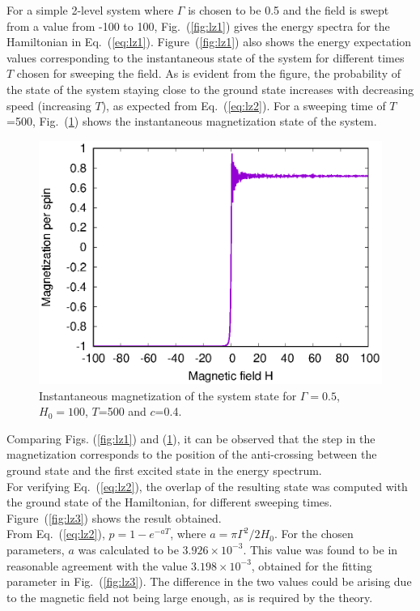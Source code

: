 \documentclass[../main.tex]{subfiles}
\begin{document}
For a simple 2-level system where $\Gamma$ is chosen to be 0.5 and the field is swept from a value from -100 to 100, Fig.~(\ref{fig:lz1}) gives the energy spectra for the Hamiltonian in Eq.~(\ref{eq:lz1}).
Figure~(\ref{fig:lz1}) also shows the energy expectation values corresponding to the instantaneous state of the system for different times $T$ chosen for sweeping the field. As is evident from the figure, the probability of the state of the system staying close to the ground state increases with decreasing speed (increasing $T$), as expected from Eq.~(\ref{eq:lz2}). For a sweeping time of $T$=500, Fig.~(\ref{fig:lz2}) shows the instantaneous magnetization state of the system.
\begin{figure}[H]
\centering 
\includegraphics[scale=0.8]{Magnetization_500.eps}
\caption{Instantaneous magnetization of the system state for $\Gamma=0.5$, $H_0=100$, $T$=500 and $c$=0.4.}
\label{fig:lz2}
\end{figure}
Comparing Figs. (\ref{fig:lz1}) and (\ref{fig:lz2}), it can be observed that the step in the magnetization corresponds to the position of the anti-crossing between the ground state and the first excited state in the energy spectrum.\\

For verifying Eq.~(\ref{eq:lz2}), the overlap of the resulting state was computed with the ground state of the Hamiltonian, for different sweeping times. Figure~(\ref{fig:lz3}) shows the result obtained.\\

From Eq.~(\ref{eq:lz2}), $p=1-e^{-aT}$, where $a={\pi \Gamma^2/2H_0}$. For the chosen parameters, $a$ was calculated to be $3.926 \times 10^{-3}$. This value was found to be in reasonable agreement with the value $3.198 \times 10^{-3}$, obtained for the fitting parameter in Fig.~(\ref{fig:lz3}). The difference in the two values could be arising due to the magnetic field not being large enough, as is required by the theory.
\end{document}
